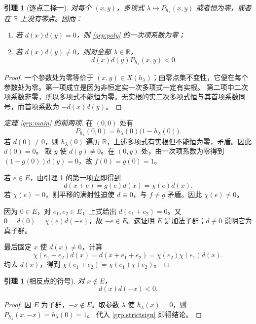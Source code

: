 \documentclass[11pt,a4paper,oneside,openany]{book}
\theoremstyle{lecture}
\newtheorem{lemma}[theorem]{引理}
\newcommand{\R}{\mathbb R}
\numberwithin{equation}{section}
\begin{document}
\begin{lemma}[逐点二择一]\label{grp:dichotomy}
对每个 $(x,y)$，多项式 $\lambda\mapsto P_{h_\lambda}(x,y)$
或者恒为零，或者在 $\R$ 上没有零点。因而：
\begin{enumerate}
\item 若 $d(x)d(y)=0$，则 \eqref{grp:poly} 的一次项系数为零；
\item 若 $d(x)d(y)\ne0$，则对全部 $\lambda\in\R$，
\begin{equation}\label{grp:strictsign}
 d(x)d(y)P_{h_\lambda}(x,y)<0.
\end{equation}
\end{enumerate}
\end{lemma}

\begin{proof}
一个参数处为零等价于 $(x,y)\in X(h_\lambda)$；由零点集不变性，它便在每个参数处为零。第一项成立是因为非恒定实一次多项式一定有实根。
第二项中二次项系数非零，所以多项式不能恒为零。无实根的实二次多项式恒与其首项系数同号，而首项系数为 $-d(x)d(y)$。
\end{proof}

\begin{proof}[定理 \ref{grp:main} 的前两项]
在 $(0,0)$ 处有
\[
 P_{h_\lambda}(0,0)=h_\lambda(0)\bigl(1-h_\lambda(0)\bigr).
\]
若 $d(0)\ne0$，则 $h_\lambda(0)$ 遍历 $\R$，上述多项式有实根但不能恒为零，矛盾。因此 $d(0)=0$。
取 $y$ 使 $d(y)\ne0$。在 $(0,y)$ 处，由一次项系数为零得到
$(1-g(0))d(y)=0$，故 $f(0)=g(0)=1$。

若 $e\in E$，由引理 \ref{grp:dichotomy} 的第一项立即得到
\[
 d(x+e)=g(e)d(x)=\chi(e)d(x).
\]
若 $\chi(e)=0$，则平移的满射性迫使 $d\equiv0$，与 $f\ne g$ 矛盾。因此 $\chi(e)\ne0$。

因为 $0\in E$，对 $e_1,e_2\in E$，上式给出
$d(e_1+e_2)=0$。又
$0=d(0)=\chi(e)d(-e)$，故 $-e\in E$。这证明 $E$ 是加法子群；$d\not\equiv0$ 说明它为真子群。

最后固定 $x$ 使 $d(x)\ne0$，计算
\[
 \chi(e_1+e_2)d(x)
 =d(x+e_1+e_2)
 =\chi(e_2)\chi(e_1)d(x).
\]
约去 $d(x)$，得到 $\chi(e_1+e_2)=\chi(e_1)\chi(e_2)$。
\end{proof}

\begin{lemma}[相反点的符号]\label{grp:oppositesign}
对 $x\notin E$，
\begin{equation}\label{grp:opposite}
 d(x)d(-x)<0.
\end{equation}
\end{lemma}

\begin{proof}
因 $E$ 为子群，$-x\notin E$。取参数 $\lambda$ 使 $h_\lambda(x)=0$，则
$P_{h_\lambda}(x,-x)=h_\lambda(0)=1$。
代入 \eqref{grp:strictsign} 即得结论。
\end{proof}
\end{document}
